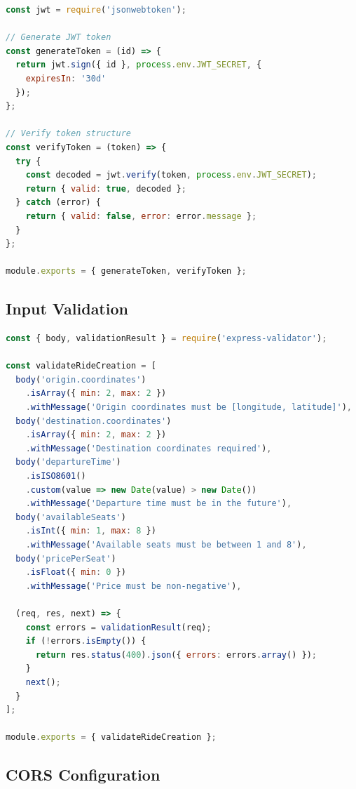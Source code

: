 \documentclass[12pt,a4paper]{article}
\begin{document}
\begin{lstlisting}[language=JavaScript, caption=Token Management]
const jwt = require('jsonwebtoken');

// Generate JWT token
const generateToken = (id) => {
  return jwt.sign({ id }, process.env.JWT_SECRET, {
    expiresIn: '30d'
  });
};

// Verify token structure
const verifyToken = (token) => {
  try {
    const decoded = jwt.verify(token, process.env.JWT_SECRET);
    return { valid: true, decoded };
  } catch (error) {
    return { valid: false, error: error.message };
  }
};

module.exports = { generateToken, verifyToken };
\end{lstlisting}

\subsection{Input Validation}

\begin{lstlisting}[language=JavaScript, caption=Request Validation Middleware]
const { body, validationResult } = require('express-validator');

const validateRideCreation = [
  body('origin.coordinates')
    .isArray({ min: 2, max: 2 })
    .withMessage('Origin coordinates must be [longitude, latitude]'),
  body('destination.coordinates')
    .isArray({ min: 2, max: 2 })
    .withMessage('Destination coordinates required'),
  body('departureTime')
    .isISO8601()
    .custom(value => new Date(value) > new Date())
    .withMessage('Departure time must be in the future'),
  body('availableSeats')
    .isInt({ min: 1, max: 8 })
    .withMessage('Available seats must be between 1 and 8'),
  body('pricePerSeat')
    .isFloat({ min: 0 })
    .withMessage('Price must be non-negative'),
  
  (req, res, next) => {
    const errors = validationResult(req);
    if (!errors.isEmpty()) {
      return res.status(400).json({ errors: errors.array() });
    }
    next();
  }
];

module.exports = { validateRideCreation };
\end{lstlisting}

\subsection{CORS Configuration}
\end{document}
